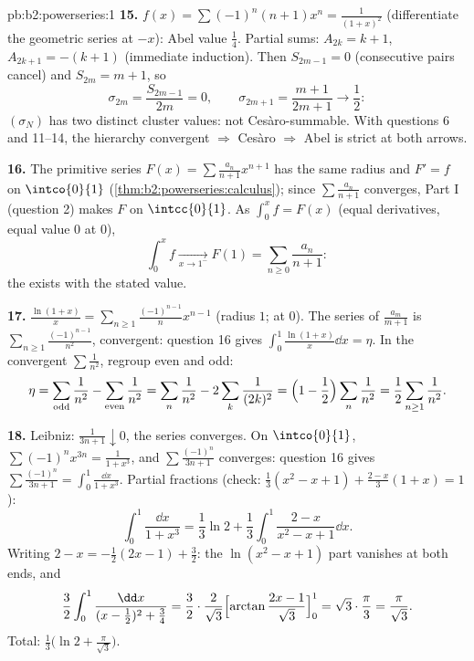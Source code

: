 \begin{solution}{pb:b2:powerseries:1}
\textbf{15.} $f(x) = \sum(-1)^n(n+1)x^n = \frac{1}{(1+x)^2}$
(differentiate the geometric series at $-x$): Abel value
$\frac14$. Partial sums: $A_{2k} = k+1$, $A_{2k+1} = -(k+1)$
(immediate induction). Then $S_{2m-1} = 0$ (consecutive pairs
cancel) and $S_{2m} = m + 1$, so
\[
\sigma_{2m} = \frac{S_{2m-1}}{2m} = 0,
\qquad
\sigma_{2m+1} = \frac{m+1}{2m+1} \to \frac12 :
\]
$(\sigma_N)$ has two distinct cluster values: not
Ces\`aro-summable. With questions 6 and 11--14, the hierarchy
convergent $\Rightarrow$ Ces\`aro $\Rightarrow$ Abel is strict
at both arrows.

\textbf{16.} The primitive series $F(x) =
\sum\frac{a_n}{n+1}x^{n+1}$ has the same radius and $F' = f$ on
$\intco{0}{1}$ (\cref{thm:b2:powerseries:calculus}); since
$\sum\frac{a_n}{n+1}$ converges, Part I (question 2) makes $F$
 on $\intcc{0}{1}$. As $\int_0^x f = F(x)$ (equal
derivatives, equal value $0$ at $0$),
\[
\int_0^x f \xrightarrow[x\to1^-]{} F(1)
= \sum_{n\geq0}\frac{a_n}{n+1} :
\]
the  exists with the stated value.

\textbf{17.} $\frac{\ln(1+x)}{x} =
\sum_{n\geq1}\frac{(-1)^{n-1}}{n}x^{n-1}$ (radius $1$;
 at $0$). The series of $\frac{a_m}{m+1}$ is
$\sum_{n\geq1}\frac{(-1)^{n-1}}{n^2}$,  convergent:
question 16 gives $\int_0^1\frac{\ln(1+x)}{x}\dd x = \eta$. In
the  convergent $\sum\frac1{n^2}$, regroup even and
odd:
\[
\eta = \sum_{\text{odd}}\frac1{n^2} -
\sum_{\text{even}}\frac1{n^2}
= \sum_{n}\frac1{n^2} - 2\sum_{k}\frac1{(2k)^2}
= \Bigl(1 - \frac12\Bigr)\sum_n\frac1{n^2}
= \frac12\sum_{n\geq1}\frac1{n^2} .
\]

\textbf{18.} Leibniz: $\frac{1}{3n+1}\downarrow0$, the series
converges. On $\intco{0}{1}$, $\sum(-1)^nx^{3n} =
\frac{1}{1+x^3}$, and $\sum\frac{(-1)^n}{3n+1}$ converges:
question 16 gives $\sum\frac{(-1)^n}{3n+1} =
\int_0^1\frac{\dd x}{1+x^3}$. Partial fractions (check:
$\frac13(x^2-x+1) + \frac{2-x}{3}(1+x) = 1$):
\[
\int_0^1\frac{\dd x}{1+x^3}
= \frac13\ln2 + \frac13\int_0^1\frac{2-x}{x^2-x+1}\dd x .
\]
Writing $2 - x = -\frac12(2x-1) + \frac32$: the $\ln(x^2-x+1)$
part vanishes at both ends, and
\[
\frac32\int_0^1\frac{\dd x}{(x-\frac12)^2 + \frac34}
= \frac32\cdot\frac{2}{\sqrt3}
\Bigl[\arctan\frac{2x-1}{\sqrt3}\Bigr]_0^1
= \sqrt3\cdot\frac{\pi}{3} = \frac{\pi}{\sqrt3} .
\]
Total: $\frac13\bigl(\ln2 + \frac{\pi}{\sqrt3}\bigr)$.


\end{solution}
